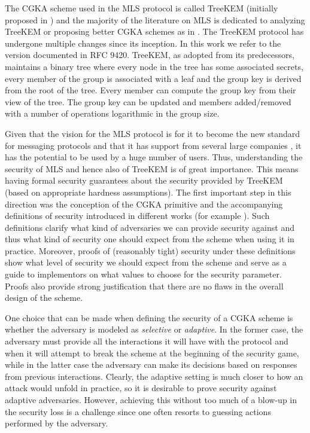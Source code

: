 The CGKA scheme used in the MLS protocol is called TreeKEM (initially proposed in \cite{treekem}) and the majority of the literature on MLS is dedicated to analyzing TreeKEM or proposing better CGKA schemes as in \cite{ttkem,rtreekem,insider-security,modular-group-messaging}. The TreeKEM protocol has undergone multiple changes since its inception. In this work we refer to the version documented in RFC 9420. TreeKEM, as adopted from its predecessors, maintains a binary tree where every node in the tree has some associated secrets, every member of the group is associated with a leaf and the group key is derived from the root of the tree. Every member can compute the group key from their view of the tree. The group key can be updated and members added/removed with a number of operations logarithmic in the group size.

Given that the vision for the MLS protocol is for it to become the new standard for messaging protocols and that it has support from several large companies \cite{google-mls,mls-support}, it has the potential to be used by a huge number of users. Thus, understanding the security of MLS and hence also of TreeKEM is of great importance. This means having formal security guarantees about the security provided by TreeKEM (based on appropriate hardness assumptions). The first important step in this direction was the conception of the CGKA primitive and the accompanying definitions of security introduced in different works (for example \cite{rtreekem, ttkem}). Such definitions clarify what kind of adversaries we can provide security against and thus what kind of security one should expect from the scheme when using it in practice. Moreover, proofs of (reasonably tight) security under these definitions show what level of security we should expect from the scheme and serve as a guide to implementors on what values to choose for the security parameter. Proofs also provide strong justification that there are no flaws in the overall design of the scheme.

One choice that can be made when defining the security of a CGKA scheme is whether the adversary is modeled as \emph{selective} or \emph{adaptive}. In the former case, the adversary must provide all the interactions it will have with the protocol and when it will attempt to break the scheme at the beginning of the security game, while in the latter case the adversary can make its decisions based on responses from previous interactions. Clearly, the adaptive setting is much closer to how an attack would unfold in practice, so it is desirable to prove security against adaptive adversaries. However, achieving this without too much of a blow-up in the security loss is a challenge since one often resorts to guessing actions performed by the adversary.

